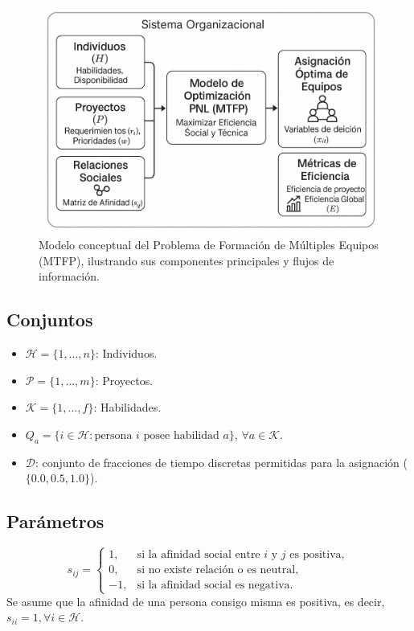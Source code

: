 \documentclass[conference]{IEEEtran}
\begin{document}
\begin{figure}[htbp]
    \centering
    \includegraphics[width=0.8\linewidth]{diagrama_conceptual_mtfp.png}
    \caption{Modelo conceptual del Problema de Formación de Múltiples Equipos (MTFP), ilustrando sus componentes principales y flujos de información.}
    \label{fig:conceptual_model}
\end{figure}

\subsection{Conjuntos}
\begin{itemize}
    \item $\mathcal{H} = \{1, ..., n\}$: Individuos.
    \item $\mathcal{P} = \{1, ..., m\}$: Proyectos.
    \item $\mathcal{K} = \{1, ..., f\}$: Habilidades.
    \item $Q_a = \{i \in \mathcal{H} : \text{persona } i \text{ posee habilidad } a\}$, $\forall a \in \mathcal{K}$.
    \item $\mathcal{D}$: conjunto de fracciones de tiempo discretas permitidas para la asignación ($\{0.0, 0.5, 1.0\}$).
\end{itemize}


\subsection{Parámetros}
\[
    s_{ij} =
    \begin{cases}
        1,  & \text{si la afinidad social entre } i \text{ y } j \text{ es positiva}, \\
        0,  & \text{si no existe relación o es neutral},                              \\
        -1, & \text{si la afinidad social es negativa}.
    \end{cases}
\]
Se asume que la afinidad de una persona consigo misma es positiva, es decir, \(s_{ii} = 1, \forall i \in \mathcal{H}\).
\end{document}
